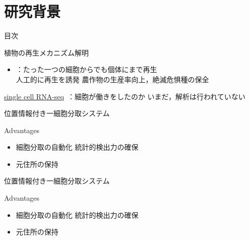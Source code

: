 \section{研究背景}

\begin{frame}[noframenumbering]{目次}
    \tableofcontents[currentsection]
\end{frame}

\begin{frame}{植物の再生メカニズム解明}
    \begin{itemize}
        \item {}：たった一つの細胞からでも個体にまで再生
        \\\ra 人工的に再生を誘発 \Ra 農作物の生産率向上，絶滅危惧種の保全
    \end{itemize}
    \vs
    \uline{single cell RNA-seq}\ \cite{kolodziejczyk2015technology}：細胞が働きをしたのか
    \Ra いまだ，解析は行われていない
    \vs
\end{frame}

\begin{frame}{位置情報付き一細胞分取システム}
    \begin{block}{Advantages}
        \begin{itemize}
            \item 細胞分取の自動化 \Ra 統計的検出力の確保
            \item 元住所の保持 \Ra {}
        \end{itemize}
    \end{block}
\end{frame}
\begin{frame}[noframenumbering]{位置情報付き一細胞分取システム}
    \begin{block}{Advantages}
        \begin{itemize}
            \item 細胞分取の自動化 \Ra 統計的検出力の確保
            \item 元住所の保持 \Ra {}
        \end{itemize}
    \end{block}
\end{frame}